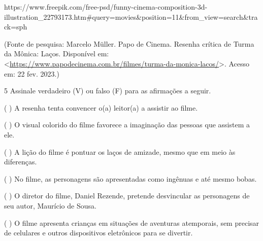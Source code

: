 {https://www.freepik.com/free-psd/funny-cinema-composition-3d-illustration\_22793173.htm\#query=movies\&position=11\&from\_view=search\&track=sph

(Fonte de pesquisa: Marcelo Müller. Papo de Cinema. Resenha crítica de
Turma da Mônica: Laços. Disponível em:
\textless{}\url{https://www.papodecinema.com.br/filmes/turma-da-monica-lacos/}\textgreater.
Acesso em: 22 fev. 2023.)

\num{5} Assinale verdadeiro (V) ou falso (F) para as afirmações a
seguir.

( ) A resenha tenta convencer o(a) leitor(a) a assistir ao filme.

( ) O visual colorido do filme favorece a imaginação das pessoas que
assistem a ele.

( ) A lição do filme é pontuar os laços de amizade, mesmo que em meio às
diferenças.

( ) No filme, as personagens são apresentadas como ingênuas e até mesmo
bobas.

( ) O diretor do filme, Daniel Rezende, pretende desvincular as
personagens de seu autor, Maurício de Sousa.

( ) O filme apresenta crianças em situações de aventuras atemporais, sem
precisar de celulares e outros dispositivos eletrônicos para se
divertir.

}
